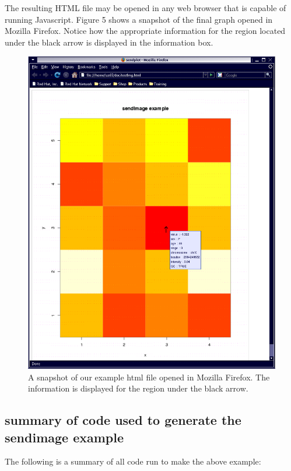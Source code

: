 \documentclass[]{article}
\begin{document}
The resulting HTML file may be opened in any web browser that is capable of running Javascript. Figure 5 shows a snapshot of the final graph opened in Mozilla Firefox. Notice how the appropriate information for the region located under the black arrow is displayed in the information box.
\begin{center}
\begin{figure}
\includegraphics{sendPlotImage}
\caption{A snapshot of our example html file opened in Mozilla Firefox. The information is displayed for the region under the black arrow.}
\end{figure}
\end{center}

\subsection{summary of code used to generate the sendimage example}

 The following is a summary of all code run to make the above example:
\end{document}
